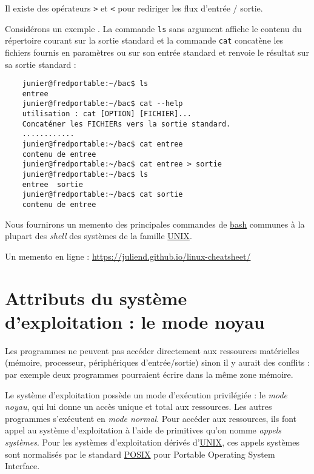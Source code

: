 \documentclass[
  11pt,
]{article}
\newcounter{prog}
\begin{document}
Il existe des opérateurs \texttt{\textgreater{}} et \texttt{\textless{}}
pour rediriger les flux d'entrée / sortie.

Considérons un exemple . La commande \texttt{ls} sans argument affiche
le contenu du répertoire courant sur la sortie standard et la commande
\texttt{cat} concatène les fichiers fournis en paramètres ou sur son
entrée standard et renvoie le résultat sur sa sortie standard :

\begin{verbatim}
    junier@fredportable:~/bac$ ls 
    entree
    junier@fredportable:~/bac$ cat --help 
    utilisation : cat [OPTION] [FICHIER]...
    Concaténer les FICHIERs vers la sortie standard.
    ............
    junier@fredportable:~/bac$ cat entree
    contenu de entree
    junier@fredportable:~/bac$ cat entree > sortie
    junier@fredportable:~/bac$ ls
    entree  sortie
    junier@fredportable:~/bac$ cat sortie
    contenu de entree
\end{verbatim}

Nous fournirons un memento des principales commandes de
\href{https://fr.wikipedia.org/wiki/Bourne-Again_shell}{bash} communes à
la plupart des \emph{shell} des systèmes de la famille
\href{https://fr.wikipedia.org/wiki/Bourne-Again_shell}{UNIX}.

Un memento en ligne : \url{https://juliend.github.io/linux-cheatsheet/}

\hypertarget{attributs-du-systuxe8me-dexploitation-le-mode-noyau}{%
\section{Attributs du système d'exploitation : le mode
noyau}\label{attributs-du-systuxe8me-dexploitation-le-mode-noyau}}

Les programmes ne peuvent pas accéder directement aux ressources
matérielles (mémoire, processeur, périphériques d'entrée/sortie) sinon
il y aurait des conflits : par exemple deux programmes pourraient écrire
dans la même zone mémoire.

Le système d'exploitation possède un mode d'exécution privilégiée : le
\emph{mode noyau}, qui lui donne un accès unique et total aux
ressources. Les autres programmes s'exécutent en \emph{mode normal}.
Pour accéder aux ressources, ils font appel au système d'exploitation à
l'aide de primitives qu'on nomme \emph{appels systèmes}. Pour les
systèmes d'exploitation dérivés d'\href{}{UNIX}, ces appels systèmes
sont normalisés par le standard
\href{https://fr.wikipedia.org/wiki/POSIX}{POSIX} pour Portable
Operating System Interface.
\end{document}
